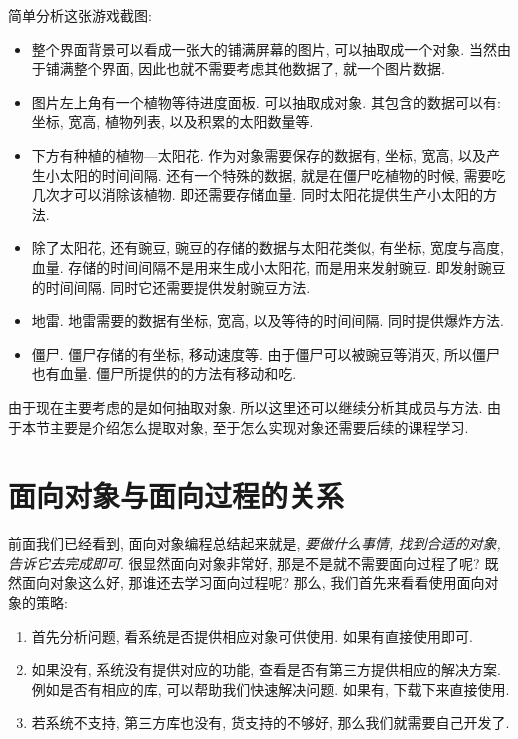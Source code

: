 简单分析这张游戏截图:
{\renewcommand{\labelitemi}{-}
\begin{itemize}
\item 整个界面背景可以看成一张大的铺满屏幕的图片, 可以抽取成一个对象. 当然由于铺满整个界面,
      因此也就不需要考虑其他数据了, 就一个图片数据.
\item 图片左上角有一个植物等待进度面板. 可以抽取成对象. 其包含的数据可以有: 坐标, 宽高,
      植物列表, 以及积累的太阳数量等. 
\item 下方有种植的植物---太阳花. 作为对象需要保存的数据有, 坐标, 宽高, 以及产生小太阳的时间间隔. 
      还有一个特殊的数据, 就是在僵尸吃植物的时候, 需要吃几次才可以消除该植物. 即还需要存储血量.
      同时太阳花提供生产小太阳的方法.
\item 除了太阳花, 还有豌豆, 豌豆的存储的数据与太阳花类似, 有坐标, 宽度与高度, 血量.
      存储的时间间隔不是用来生成小太阳花, 而是用来发射豌豆. 即发射豌豆的时间间隔.
      同时它还需要提供发射豌豆方法.
\item 地雷. 地雷需要的数据有坐标, 宽高, 以及等待的时间间隔. 同时提供爆炸方法.
\item 僵尸. 僵尸存储的有坐标, 移动速度等. 由于僵尸可以被豌豆等消灭, 所以僵尸也有血量. 
      僵尸所提供的的方法有移动和吃.
\end{itemize}
}
由于现在主要考虑的是如何抽取对象. 所以这里还可以继续分析其成员与方法. 由于本节主要是介绍怎么提取对象,
至于怎么实现对象还需要后续的课程学习.




\section{面向对象与面向过程的关系}

前面我们已经看到, 面向对象编程总结起来就是, \emph{要做什么事情, 找到合适的对象, 告诉它去完成即可}.
很显然面向对象非常好, 那是不是就不需要面向过程了呢? 既然面向对象这么好, 那谁还去学习面向过程呢?
那么, 我们首先来看看使用面向对象的策略: 

\begin{enumerate}
\item 首先分析问题, 看系统是否提供相应对象可供使用. 如果有直接使用即可. 
\item 如果没有, 系统没有提供对应的功能, 查看是否有第三方提供相应的解决方案. 例如是否有相应的库, 
      可以帮助我们快速解决问题. 如果有, 下载下来直接使用. 
\item 若系统不支持, 第三方库也没有, 货支持的不够好, 那么我们就需要自己开发了.      
\end{enumerate}

